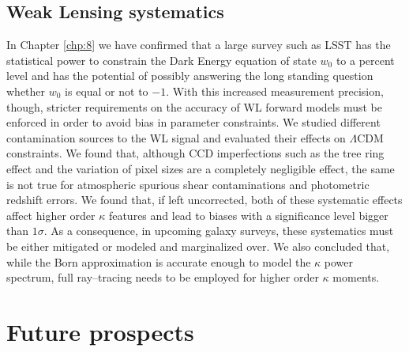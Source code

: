 \subsection{Weak Lensing systematics}
In Chapter \ref{chp:8} we have confirmed that a large survey such as LSST has the statistical power to constrain the Dark Energy equation of state $w_0$ to a percent level and has the potential of possibly answering the long standing question whether $w_0$ is equal or not to $-1$. With this increased measurement precision, though, stricter requirements on the accuracy of WL forward models must be enforced in order to avoid bias in parameter constraints. We studied different contamination sources to the WL signal and evaluated their effects on $\Lambda$CDM constraints. We found that, although CCD imperfections such as the tree ring effect and the variation of pixel sizes are a completely negligible effect, the same is not true for atmospheric spurious shear contaminations and photometric redshift errors. We found that, if left uncorrected, both of these systematic effects affect higher order $\kappa$ features and lead to biases with a significance level bigger than $1\sigma$. As a consequence, in upcoming galaxy surveys, these systematics must be either mitigated or modeled and marginalized over. We also concluded that, while the Born approximation is accurate enough to model the $\kappa$ power spectrum, full ray--tracing needs to be employed for higher order $\kappa$ moments.      

\section{Future prospects}

